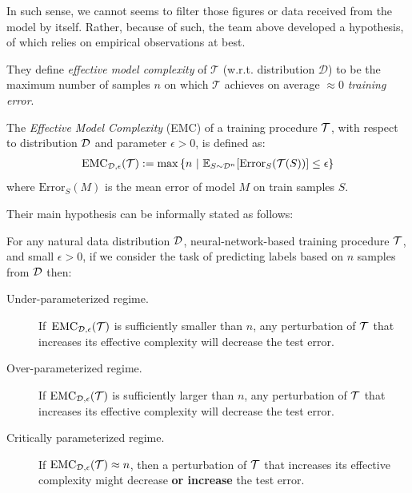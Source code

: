 In such sense, we cannot seems to filter those figures or data received from the model by itself. Rather, because of such, the team above developed a hypothesis, of which relies on empirical observations at best. 

They define \emph{effective model complexity} of $\mathcal{T}$ (w.r.t. distribution $\mathcal D$) to be the maximum number of samples $n$ on which $\mathcal{T}$ achieves on average $\approx 0$ \emph{training error}. 

\newcommand{\EMC}{\mathrm{EMC}}
\begin{definition}
The \emph{Effective Model Complexity} (EMC) of a training procedure $\mathcal{T}$, with respect to distribution $\mathcal{D}$ and parameter $\epsilon>0$,
is defined as:
\begin{align*}
    \EMC_{\cD,\eps}(\cT)
    :=  \max \left\{n ~|~ \E_{S \sim \cD^n}[ \mathrm{Error}_S( \cT( S )  ) ] \leq \eps \right\}
    \end{align*}
    where $\mathrm{Error}_S(M)$ is the mean error of model $M$ on train samples $S$.
\end{definition}

Their main hypothesis can be informally stated as follows:

\begin{hypothesis} \label{hyp:informaldd}
For any natural data distribution $\mathcal{D}$, neural-network-based training procedure $\mathcal{T}$, and small $\epsilon>0$,
if we consider the task of predicting labels based on  $n$ samples from $\mathcal{D}$ then:
\begin{description}
    \item[Under-parameterized regime.]  If~$\EMC_{\cD,\epsilon}(\cT)$ is sufficiently smaller than $n$, any perturbation of $\mathcal{T}$ that increases its effective complexity will decrease the test error.
    \item[Over-parameterized regime.] If $\EMC_{\cD,\epsilon}(\cT)$ is sufficiently larger than $n$,
    any perturbation of $\mathcal{T}$ that increases its effective complexity will decrease the test error.
    
    \item[Critically parameterized regime.] If $\EMC_{\cD,\epsilon}(\cT) \approx n$, then
    a perturbation of $\mathcal{T}$ that increases its effective complexity
    might decrease {\bf or increase} the test error.
\end{description}
\end{hypothesis}

